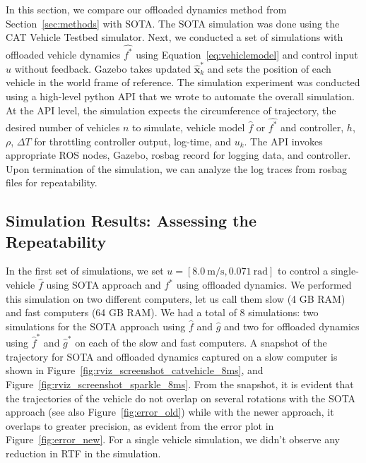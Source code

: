 \documentclass[aps,pra,twocolumn,notitlepage,nofootinbib,superscriptaddress]{revtex4-1}
\def\xbf{{\mathbf x}}
\begin{document}
In this section, we compare our offloaded dynamics method from Section~\ref{sec:methods} with SOTA. The SOTA simulation was done using the CAT Vehicle Testbed simulator. 
Next, we conducted a set of simulations with offloaded vehicle dynamics $\hat{f^*}$ using Equation~\eqref{eq:vehiclemodel} and control input $u$ without feedback. Gazebo takes updated $\hat{\xbf}_k^*$ and sets the position of each vehicle in the world frame of reference. The simulation experiment was conducted using a high-level python API that we wrote to automate the overall simulation. At the API level, the simulation expects the circumference of trajectory, the desired number of vehicles $n$ to simulate,  vehicle model $\hat{f}$ or $\hat{f^*}$ and controller, $h$, $\rho$, $\Delta T$ for throttling controller output, log-time, and $u_k$. The API invokes appropriate ROS nodes, Gazebo, rosbag record for logging data, and controller. Upon termination of the simulation, we can analyze the log traces from rosbag files for repeatability.




\subsection{Simulation Results: Assessing the Repeatability}
In the first set of simulations, we set $u = [8.0~\textrm{m/s}, 0.071~\textrm{rad}]$ to control a single-vehicle $\hat{f}$ using SOTA approach and $f^*$ using offloaded dynamics. We performed this simulation on two different computers, let us call them slow (4 GB RAM) and fast computers (64 GB RAM). We had a total of 8 simulations: two simulations for the SOTA approach using $\hat{f}$ and $\hat{g}$ and two for offloaded dynamics using $\hat{f}^*$ and $\hat{g}^*$ on each of the slow and fast computers. A snapshot of the trajectory for SOTA and offloaded dynamics captured on a slow computer is shown in Figure~\ref{fig:rviz_screenshot_catvehicle_8ms}, and Figure~\ref{fig:rviz_screenshot_sparkle_8ms}. From the snapshot, it is evident that the trajectories of the vehicle do not overlap on several rotations with the SOTA approach (see also Figure~\ref{fig:error_old}) while with the newer approach, it overlaps to greater precision, as evident from the error plot in Figure~\ref{fig:error_new}. For a single vehicle simulation, we didn't observe any reduction in RTF in the simulation.
\end{document}
